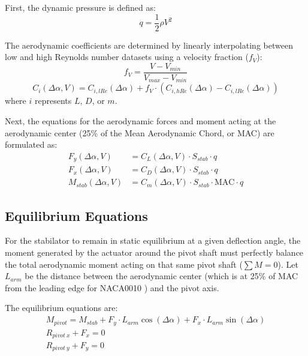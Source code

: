 \documentclass[
bindingoffset=5mm,  %
footnoteindent=3mm, %
hyphenation=true    %
]{src/wut-thesis}
\begin{document}
	First, the dynamic pressure is defined as:
	\begin{equation}
		q = \frac{1}{2} \rho V^2
	\end{equation}
	
	The aerodynamic coefficients are determined by linearly interpolating between low and high Reynolds number datasets using a velocity fraction ($f_V$):
	\begin{equation}
		f_V = \frac{V - V_{min}}{V_{max} - V_{min}}
	\end{equation}
	\begin{equation}
		C_{i}(\Delta \alpha, V) = C_{i, lRe}(\Delta \alpha) + f_V \cdot \left( C_{i, hRe}(\Delta \alpha) - C_{i, lRe}(\Delta \alpha) \right)
	\end{equation}
	where $i$ represents $L$, $D$, or $m$.
	
	Next, the equations for the aerodynamic forces and moment acting at the aerodynamic center (25\% of the Mean Aerodynamic Chord, or MAC) are formulated as:
	\begin{align}
		F_y(\Delta \alpha, V) &= C_L(\Delta \alpha, V) \cdot S_{stab} \cdot q \\
		F_x(\Delta \alpha, V) &= C_D(\Delta \alpha, V) \cdot S_{stab} \cdot q \\
		M_{stab}(\Delta \alpha, V) &= C_m(\Delta \alpha, V) \cdot S_{stab} \cdot \text{MAC} \cdot q
	\end{align}
	
	\subsection{Equilibrium Equations}
	
	For the stabilator to remain in static equilibrium at a given deflection angle, the moment generated by the actuator around the pivot shaft must perfectly balance the total aerodynamic moment acting on that same pivot shaft ($\sum M = 0$). Let $L_{arm}$ be the distance between the aerodynamic center (which is at 25\% of MAC from the leading edge for NACA0010 \cite{report824}) and the pivot axis.
	
	The equilibrium equations are:
	\begin{gather}
		M_{pivot} = M_{stab} + F_y \cdot L_{arm} \cos(\Delta \alpha) + F_x \cdot L_{arm} \sin(\Delta \alpha) \\
		R_{pivot \ x} + F_x = 0 \\
		R_{pivot \ y} + F_y = 0
	\end{gather}
	
\end{document}
